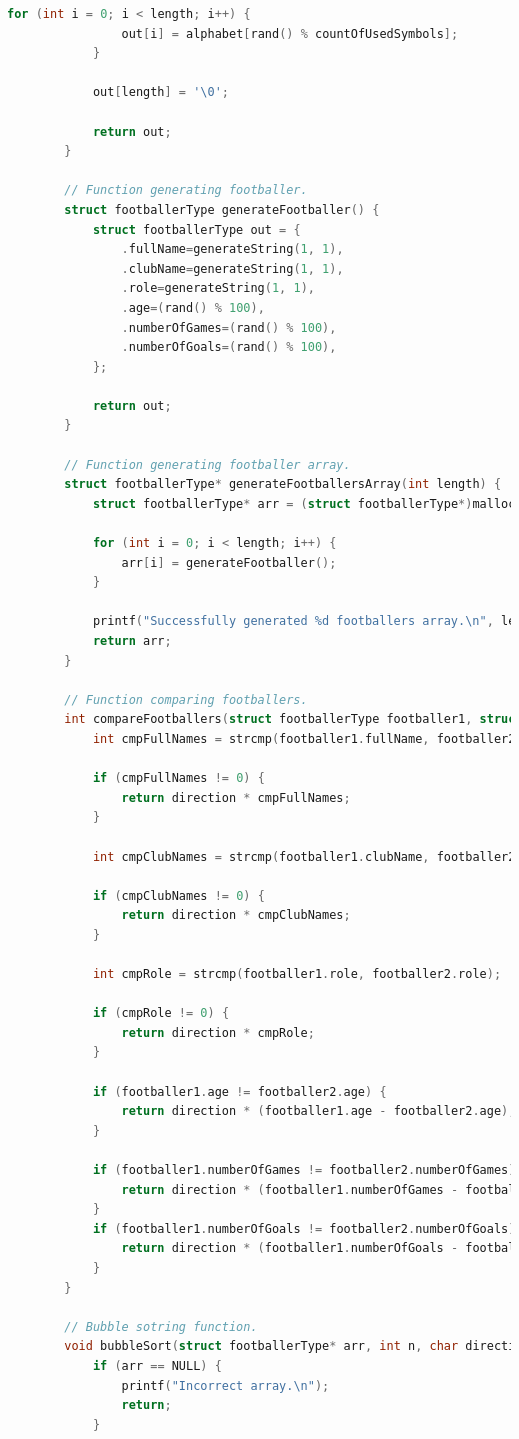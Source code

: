 \documentclass[12pt]{article}
\begin{document}
\begin{lstlisting}[language=C]
			for (int i = 0; i < length; i++) {
				out[i] = alphabet[rand() % countOfUsedSymbols];
			}
			
			out[length] = '\0';
			
			return out;
		}
		
		// Function generating footballer.
		struct footballerType generateFootballer() {
			struct footballerType out = {
				.fullName=generateString(1, 1),
				.clubName=generateString(1, 1),
				.role=generateString(1, 1),
				.age=(rand() % 100),
				.numberOfGames=(rand() % 100),
				.numberOfGoals=(rand() % 100),
			};
			
			return out;
		}
		
		// Function generating footballer array.
		struct footballerType* generateFootballersArray(int length) {
			struct footballerType* arr = (struct footballerType*)malloc(sizeof(struct footballerType) * length);
			
			for (int i = 0; i < length; i++) {
				arr[i] = generateFootballer();
			}
			
			printf("Successfully generated %d footballers array.\n", length);
			return arr;
		}
		
		// Function comparing footballers.
		int compareFootballers(struct footballerType footballer1, struct footballerType footballer2, int direction) {
			int cmpFullNames = strcmp(footballer1.fullName, footballer2.fullName);
			
			if (cmpFullNames != 0) {
				return direction * cmpFullNames;    
			}
			
			int cmpClubNames = strcmp(footballer1.clubName, footballer2.clubName);
			
			if (cmpClubNames != 0) {
				return direction * cmpClubNames;    
			}
			
			int cmpRole = strcmp(footballer1.role, footballer2.role);
			
			if (cmpRole != 0) {
				return direction * cmpRole;    
			}
			
			if (footballer1.age != footballer2.age) {
				return direction * (footballer1.age - footballer2.age);
			}
			
			if (footballer1.numberOfGames != footballer2.numberOfGames) {
				return direction * (footballer1.numberOfGames - footballer2.numberOfGames);
			}
			if (footballer1.numberOfGoals != footballer2.numberOfGoals) {
				return direction * (footballer1.numberOfGoals - footballer2.numberOfGoals);
			}
		}
		
		// Bubble sotring function.
		void bubbleSort(struct footballerType* arr, int n, char direction) {
			if (arr == NULL) {
				printf("Incorrect array.\n");
				return;
			}
			

\end{lstlisting}
\end{document}
